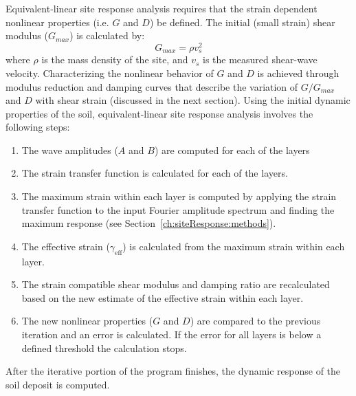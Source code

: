 \documentclass[11pt]{report}
\begin{document}
Equivalent-linear site response analysis requires that the strain dependent nonlinear properties
(i.e. $G$ and $D$) be defined.  The initial (small strain) shear modulus ($G_{max}$) is calculated by:
\begin{equation}
  G_{max} = \rho v_s ^ 2
\end{equation}
where $\rho$ is the mass density of the site, and $v_s$ is the measured shear-wave velocity.
Characterizing the nonlinear behavior of $G$ and $D$ is achieved through modulus reduction and
damping curves that describe the variation of $G/G_{max}$ and $D$ with shear strain (discussed in
the next section).  Using the initial dynamic properties of the soil, equivalent-linear site
response analysis involves the following steps:
\begin{enumerate}
  \item The wave amplitudes ($A$ and $B$) are computed for each of the layers
  \item The strain transfer function is calculated for each of the layers.
  \item The maximum strain within each layer is computed by applying the strain transfer function
	to the input Fourier amplitude spectrum and finding the maximum response (see
	Section~\ref{ch:siteResponse:methods}).
  \item The effective strain ($\gamma_{\mathrm{eff}}$) is calculated from the maximum strain within
	each layer.
  \item The strain compatible shear modulus and damping ratio are recalculated based on the new
	estimate of the effective strain within each layer.
  \item The new nonlinear properties ($G$ and $D$) are compared to the previous iteration and an
	error is calculated.  If the error for all layers is below a defined threshold the calculation
	stops.
\end{enumerate}
After the iterative portion of the program finishes, the dynamic response of the soil deposit is
computed.  


\end{document}
